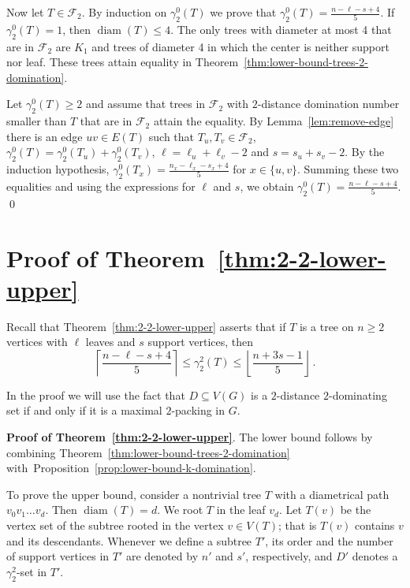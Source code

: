\documentclass[12pt]{article}
\newcommand{\mrho}{\gamma_2^2}
\DeclareMathOperator{\diam}{diam}
\newcommand{\F}{\mathcal{F}}
\begin{document}
    Now let $T \in \F_2$. By induction on $\gamma_2^0(T)$ we prove that $\gamma_2^0(T) = \frac{n-\ell-s+4}{5}$. If $\gamma_2^0(T) = 1$, then $\diam(T) \leq 4$. The only trees with diameter at most 4 that are in $\F_2$ are $K_1$ and trees
    of diameter 4 in which the center is neither support nor leaf. These trees attain equality in Theorem~\ref{thm:lower-bound-trees-2-domination}. 

    Let $\gamma_2^0(T) \geq 2$ and assume that trees in $\F_2$ with $2$-distance domination number smaller than $T$ that are in $\F_2$ attain the equality. By Lemma~\ref{lem:remove-edge} there is an edge $uv \in E(T)$ such that $T_u, T_v \in \F_2$, $\gamma_2^0(T) = \gamma_2^0(T_u) + \gamma_2^0(T_v)$, $\ell = \ell_u + \ell_v - 2$ and $s = s_u + s_v - 2$. By the induction hypothesis, $\gamma_2^0(T_x) = \frac{n_x-\ell_x-s_x+4}{5}$ for $x \in \{u,v\}$. Summing these two equalities and using the expressions for $\ell$ and $s$, we obtain $\gamma_2^0(T) = \frac{n-\ell-s+4}{5}$. 
\qed

\section{Proof of Theorem~\ref{thm:2-2-lower-upper}}    
\label{sec:proof2}

Recall that Theorem~\ref{thm:2-2-lower-upper} asserts that if $T$ is a tree on $n \ge 2$ vertices with $\ell$ leaves and $s$ support vertices, then 
    $$\left \lceil \frac{n-\ell-s+4}{5} \right \rceil \leq \mrho(T) \leq \left \lfloor \frac{n+3s-1}{5} \right \rfloor\,.$$

In the proof we will use the fact that $D \subseteq V(G)$ is a $2$-distance $2$-dominating set if and only if it is a maximal $2$-packing in $G$.

\medskip\noindent 
{\bf Proof of Theorem~\ref{thm:2-2-lower-upper}}. 
The lower bound follows by combining Theorem~\ref{thm:lower-bound-trees-2-domination} with~Proposition~\ref{prop:lower-bound-k-domination}. 

To prove the upper bound, consider a nontrivial tree $T$ with a diametrical path $v_0v_1 \ldots v_{d}$. Then $\diam(T)=d$. We root $T$ in the leaf $v_{d}$. Let $T(v)$ be the vertex set of the subtree rooted in the vertex $v \in V(T)$; that is $T(v)$ contains $v$ and its descendants.  Whenever we define a subtree $T'$, its order and the number of support vertices in $T'$ are denoted by $n'$ and $s'$, respectively, and $D'$ denotes a $\mrho$-set in $T'$. 
\end{document}
